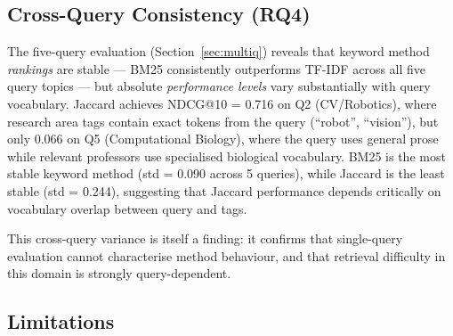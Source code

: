 \documentclass[11pt,a4paper]{article}
\begin{document}
\subsection{Cross-Query Consistency (RQ4)}

The five-query evaluation (Section~\ref{sec:multiq}) reveals that keyword
method \emph{rankings} are stable --- BM25 consistently outperforms TF-IDF
across all five query topics --- but absolute \emph{performance levels} vary
substantially with query vocabulary.
Jaccard achieves NDCG@10 = 0.716 on Q2 (CV/Robotics), where research area
tags contain exact tokens from the query (``robot'', ``vision''), but only
0.066 on Q5 (Computational Biology), where the query uses general prose while
relevant professors use specialised biological vocabulary.
BM25 is the most stable keyword method (std = 0.090 across 5 queries),
while Jaccard is the least stable (std = 0.244), suggesting that Jaccard
performance depends critically on vocabulary overlap between query and tags.

This cross-query variance is itself a finding: it confirms that single-query
evaluation cannot characterise method behaviour, and that retrieval difficulty
in this domain is strongly query-dependent.

\subsection{Limitations}
\end{document}
